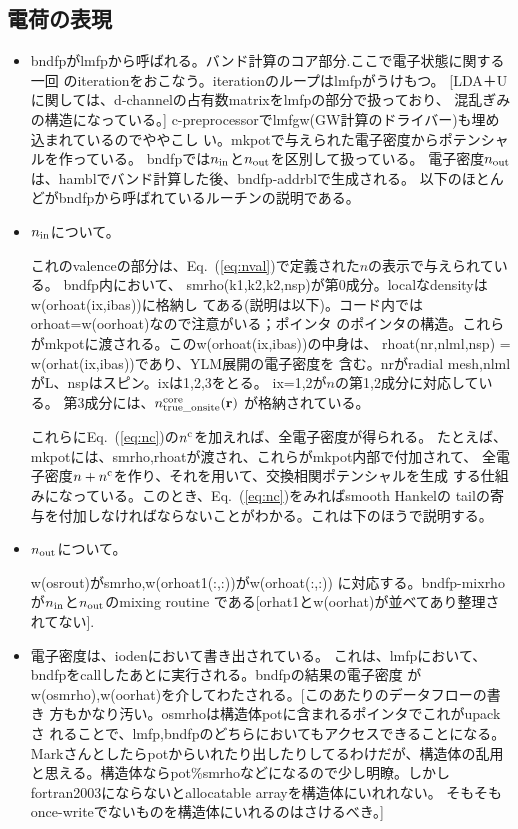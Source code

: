 \documentclass[a4paper,10pt,aip,onecolumn,amsmath,amssymb,floatfix,rmp]{revtex4-1}
\newcommand{\bfr}{{\bf r}}
\newcommand{\req}[1]{\mbox{Eq.~\!(\ref{#1})}}
\begin{document}
\subsection{電荷の表現}
\begin{itemize}
\item 
bndfpがlmfpから呼ばれる。バンド計算のコア部分.ここで電子状態に関する一回
のiterationをおこなう。iterationのループはlmfpがうけもつ。
[LDA＋Uに関しては、d-channelの占有数matrixをlmfpの部分で扱っており、
混乱ぎみの構造になっている。]
c-preprocessorでlmfgw(GW計算のドライバー)も埋め込まれているのでややこし
い。mkpotで与えられた電子密度からポテンシャルを作っている。
bndfpでは$n_{\rm in}$と$n_{\rm out}$を区別して扱っている。
電子密度$n_{\rm out}$は、hamblでバンド計算した後、bndfp-addrblで生成される。
以下のほとんどがbndfpから呼ばれているルーチンの説明である。

\item 
$n_{\rm in}$について。

これのvalenceの部分は、\req{eq:nval}で定義された$n$の表示で与えられている。
bndfp内において、
smrho(k1,k2,k2,nsp)が第0成分。localなdensityはw(orhoat(ix,ibas))に格納し
てある(説明は以下)。コード内ではorhoat=w(oorhoat)なので注意がいる；ポインタ
のポインタの構造。これらがmkpotに渡される。このw(orhoat(ix,ibas))の中身は、
rhoat(nr,nlml,nsp) = w(orhat(ix,ibas))であり、YLM展開の電子密度を
含む。nrがradial mesh,nlmlがL、nspはスピン。ixは1,2,3をとる。
ix=1,2が$n$の第1,2成分に対応している。
第3成分には、$ n^{\rm core}_{\rm true\_onsite}(\bfr)$
が格納されている。

これらに\req{eq:nc}の$n^{\rm c}$を加えれば、全電子密度が得られる。
たとえば、mkpotには、smrho,rhoatが渡され、これらがmkpot内部で付加されて、
全電子密度$n+n^{\rm c}$を作り、それを用いて、交換相関ポテンシャルを生成
する仕組みになっている。このとき、\req{eq:nc}をみればsmooth Hankelの
tailの寄与を付加しなければならないことがわかる。これは下のほうで説明する。

\item
$n_{\rm out}$について。

w(osrout)がsmrho,w(orhoat1(:,:))がw(orhoat(:,:))
に対応する。bndfp-mixrhoが$n_{\rm in}$と$n_{\rm out}$のmixing routine
である[orhat1とw(oorhat)が並べてあり整理されてない].

\item
電子密度は、iodenにおいて書き出されている。
これは、lmfpにおいて、bndfpをcallしたあとに実行される。bndfpの結果の電子密度
がw(osmrho),w(oorhat)を介してわたされる。{\small[このあたりのデータフローの書き
     方もかなり汚い。osmrhoは構造体potに含まれるポインタでこれがupackさ
     れることで、lmfp,bndfpのどちらにおいてもアクセスできることになる。
     Markさんとしたらpotからいれたり出したりしてるわけだが、構造体の乱用
     と思える。構造体ならpot\%smrhoなどになるので少し明瞭。しかし
     fortran2003にならないとallocatable arrayを構造体にいれれない。
     そもそもonce-writeでないものを構造体にいれるのはさけるべき。]}



\end{itemize}
\end{document}
